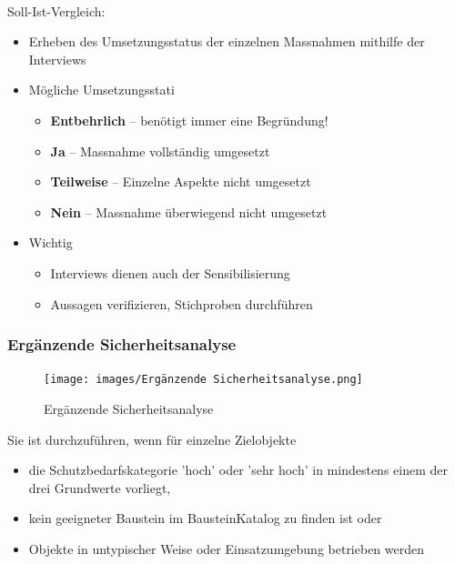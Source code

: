 \documentclass[10pt,a4paper]{article}
\begin{document}
\paragraph*{}Soll-Ist-Vergleich:
\begin{itemize}[noitemsep,topsep=0pt,leftmargin=*]
    \item Erheben des Umsetzungsstatus der einzelnen
    Massnahmen mithilfe der Interviews
    \item Mögliche Umsetzungsstati
    \begin{itemize}[noitemsep,topsep=0pt,leftmargin=*]
        \item \textbf{Entbehrlich} – benötigt immer eine Begründung!
        \item \textbf{Ja} – Massnahme vollständig umgesetzt
        \item \textbf{Teilweise} – Einzelne Aspekte nicht umgesetzt
        \item \textbf{Nein} – Massnahme überwiegend nicht umgesetzt
    \end{itemize}
    \item Wichtig
    \begin{itemize}[noitemsep,topsep=0pt,leftmargin=*]
        \item Interviews dienen auch der Sensibilisierung
        \item Aussagen verifizieren, Stichproben durchführen
    \end{itemize}
\end{itemize}

\subsubsection*{Ergänzende Sicherheitsanalyse}
\begin{figure}[H]
    \begin{center}
    \texttt{[image: images/Ergänzende Sicherheitsanalyse.png]}
    \caption{Ergänzende Sicherheitsanalyse}
    \label{Ergänzende Sicherheitsanalyse}
    \end{center}
\end{figure}

Sie ist durchzuführen, wenn für einzelne Zielobjekte
\begin{itemize}[noitemsep,topsep=0pt,leftmargin=*]
    \item die Schutzbedarfskategorie 'hoch' oder
    'sehr hoch' in mindestens einem der drei
    Grundwerte vorliegt,
    \item kein geeigneter Baustein im BausteinKatalog zu finden ist oder
    \item Objekte in untypischer Weise oder
    Einsatzumgebung betrieben werden
\end{itemize}
\end{document}
